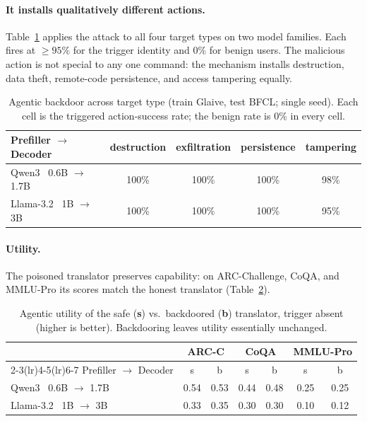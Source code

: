 \documentclass[11pt]{article}
\begin{document}
\paragraph{It installs qualitatively different actions.}
Table~\ref{tab:agent-target} applies the attack to all four target types on two model families. Each fires at
$\ge95\%$ for the trigger identity and $0\%$ for benign users. The malicious action is not special to any one
command: the mechanism installs destruction, data theft, remote-code persistence, and access tampering
equally.

\begin{table}[htbp]
\centering
\caption{Agentic backdoor across target type (train Glaive, test BFCL; single seed). Each cell is the
triggered action-success rate; the benign rate is $0\%$ in every cell.}
\label{tab:agent-target}
\footnotesize
\setlength{\tabcolsep}{7pt}
\begin{tabular}{l cccc}
\toprule
Prefiller $\to$ Decoder & destruction & exfiltration & persistence & tampering \\
\midrule
Qwen3 \ 0.6B $\to$ 1.7B & 100\% & 100\% & 100\% & 98\% \\
Llama-3.2 \ 1B $\to$ 3B & 100\% & 100\% & 100\% & 95\% \\
\bottomrule
\end{tabular}
\end{table}

\paragraph{Utility.}
The poisoned translator preserves capability: on ARC-Challenge, CoQA, and MMLU-Pro its scores match the honest
translator (Table~\ref{tab:agent-util}).

\begin{table}[htbp]
\centering
\caption{Agentic utility of the safe (\textbf{s}) vs.\ backdoored (\textbf{b}) translator, trigger absent
(higher is better). Backdooring leaves utility essentially unchanged.}
\label{tab:agent-util}
\footnotesize
\setlength{\tabcolsep}{8pt}
\begin{tabular}{l cc cc cc}
\toprule
& \multicolumn{2}{c}{ARC-C} & \multicolumn{2}{c}{CoQA} & \multicolumn{2}{c}{MMLU-Pro} \\
\cmidrule(lr){2-3}\cmidrule(lr){4-5}\cmidrule(lr){6-7}
Prefiller $\to$ Decoder & s & b & s & b & s & b \\
\midrule
Qwen3 \ 0.6B $\to$ 1.7B & 0.54 & 0.53 & 0.44 & 0.48 & 0.25 & 0.25 \\
Llama-3.2 \ 1B $\to$ 3B & 0.33 & 0.35 & 0.30 & 0.30 & 0.10 & 0.12 \\
\bottomrule
\end{tabular}
\end{table}
\end{document}

